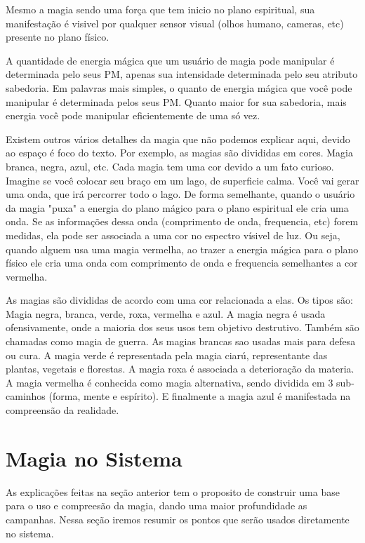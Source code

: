 Mesmo a magia sendo uma força que tem inicio no plano espiritual, sua manifestação é visivel por qualquer sensor visual (olhos humano, cameras, etc) presente no plano físico.

A quantidade de energia mágica que um usuário de magia pode manipular é determinada pelo seus PM, apenas sua intensidade determinada pelo seu atributo sabedoria. Em palavras mais simples, o quanto de energia mágica que você pode manipular é determinada pelos seus PM. Quanto maior for sua sabedoria, mais energia você pode manipular eficientemente de uma só vez.

Existem outros vários detalhes da magia que não podemos explicar aqui, devido ao espaço é foco do texto. Por exemplo, as magias são divididas em cores. Magia branca, negra, azul, etc. Cada magia tem uma cor devido a um fato curioso. Imagine se você colocar seu braço em um lago, de superficie calma. Você vai gerar uma onda, que irá percorrer todo o lago. De forma semelhante, quando o usuário da magia "puxa" a energia do plano mágico para o plano espiritual ele cria uma onda. Se as informações dessa onda (comprimento de onda, frequencia, etc) forem medidas, ela pode ser associada a uma cor no espectro vísivel de luz. Ou seja, quando alguem usa uma magia vermelha, ao trazer a energia mágica para o plano físico ele cria uma onda com comprimento de onda e frequencia semelhantes a cor vermelha.  


As magias são divididas de acordo com uma cor relacionada a elas. Os tipos são: Magia negra, branca, verde, roxa, vermelha e azul. A magia negra é usada ofensivamente, onde a maioria dos seus usos tem objetivo destrutivo. Também são chamadas como magia de guerra. As magias brancas sao usadas mais para defesa ou cura. A magia verde é representada pela magia ciarú, representante das plantas, vegetais e florestas. A magia roxa é associada a deterioração da materia. A magia vermelha é conhecida como magia alternativa, sendo dividida em 3 sub-caminhos (forma, mente e espírito). E finalmente a magia azul é manifestada na compreensão da realidade. 

\section{Magia no Sistema}

As explicações feitas na seção anterior tem o proposito de construir uma base para o uso e compreesão da magia, dando uma maior profundidade as campanhas. Nessa seção iremos resumir os pontos que serão usados diretamente no sistema.

